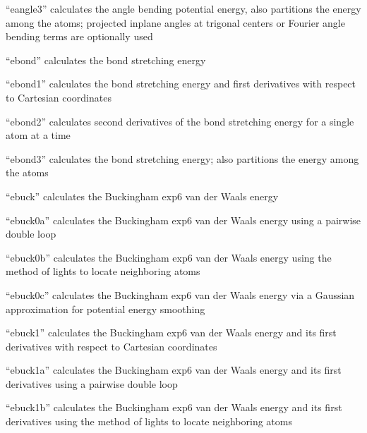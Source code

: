 \documentclass[letterpaper,11pt,english]{sphinxmanual}
\begin{document}
“eangle3” calculates the angle bending potential energy, also partitions the energy among the atoms; projected in\sphinxhyphen{}plane angles at trigonal centers or Fourier angle bending terms are optionally used


“ebond” calculates the bond stretching energy


“ebond1” calculates the bond stretching energy and first derivatives with respect to Cartesian coordinates


“ebond2” calculates second derivatives of the bond stretching energy for a single atom at a time


“ebond3” calculates the bond stretching energy; also partitions the energy among the atoms


“ebuck” calculates the Buckingham exp\sphinxhyphen{}6 van der Waals energy


“ebuck0a” calculates the Buckingham exp\sphinxhyphen{}6 van der Waals energy using a pairwise double loop


“ebuck0b” calculates the Buckingham exp\sphinxhyphen{}6 van der Waals energy using the method of lights to locate neighboring atoms


“ebuck0c” calculates the Buckingham exp\sphinxhyphen{}6 van der Waals energy via a Gaussian approximation for potential energy smoothing


“ebuck1” calculates the Buckingham exp\sphinxhyphen{}6 van der Waals energy and its first derivatives with respect to Cartesian coordinates


“ebuck1a” calculates the Buckingham exp\sphinxhyphen{}6 van der Waals energy and its first derivatives using a pairwise double loop


“ebuck1b” calculates the Buckingham exp\sphinxhyphen{}6 van der Waals energy and its first derivatives using the method of lights to locate neighboring atoms
\end{document}
